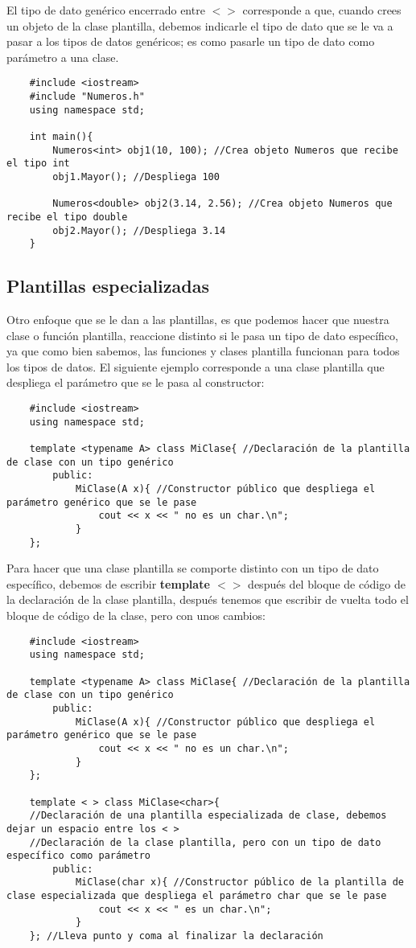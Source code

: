 El tipo de dato genérico encerrado entre $<>$ corresponde a que, cuando crees un objeto de la clase plantilla, debemos indicarle el tipo de dato que se le va a pasar a los tipos de datos genéricos; es como pasarle un tipo de dato como parámetro a una clase.
\begin{lstlisting}
    #include <iostream>
    #include "Numeros.h"
    using namespace std;
    
    int main(){
        Numeros<int> obj1(10, 100); //Crea objeto Numeros que recibe el tipo int
        obj1.Mayor(); //Despliega 100
        
        Numeros<double> obj2(3.14, 2.56); //Crea objeto Numeros que recibe el tipo double
        obj2.Mayor(); //Despliega 3.14
    }
\end{lstlisting}

\subsection{Plantillas especializadas}
Otro enfoque que se le dan a las plantillas, es que podemos hacer que nuestra clase o función plantilla, reaccione distinto si le pasa un tipo de dato específico, ya que como bien sabemos, las funciones y clases plantilla funcionan para todos los tipos de datos. El siguiente ejemplo corresponde a una clase plantilla que despliega el parámetro que se le pasa al constructor:
\begin{lstlisting}
    #include <iostream>
    using namespace std;
    
    template <typename A> class MiClase{ //Declaración de la plantilla de clase con un tipo genérico
        public:
            MiClase(A x){ //Constructor público que despliega el parámetro genérico que se le pase
                cout << x << " no es un char.\n";
            }
    };
\end{lstlisting}
Para hacer que una clase plantilla se comporte distinto con un tipo de dato específico, debemos de escribir \textbf{template $< >$} después del bloque de código de la declaración de la clase plantilla, después tenemos que escribir de vuelta todo el bloque de código de la clase, pero con unos cambios:
\begin{lstlisting}
    #include <iostream>
    using namespace std;
    
    template <typename A> class MiClase{ //Declaración de la plantilla de clase con un tipo genérico
        public:
            MiClase(A x){ //Constructor público que despliega el parámetro genérico que se le pase
                cout << x << " no es un char.\n";
            }
    };
    
    template < > class MiClase<char>{
    //Declaración de una plantilla especializada de clase, debemos dejar un espacio entre los < >
    //Declaración de la clase plantilla, pero con un tipo de dato específico como parámetro
        public:
            MiClase(char x){ //Constructor público de la plantilla de clase especializada que despliega el parámetro char que se le pase
                cout << x << " es un char.\n";
            }
    }; //Lleva punto y coma al finalizar la declaración
\end{lstlisting}
